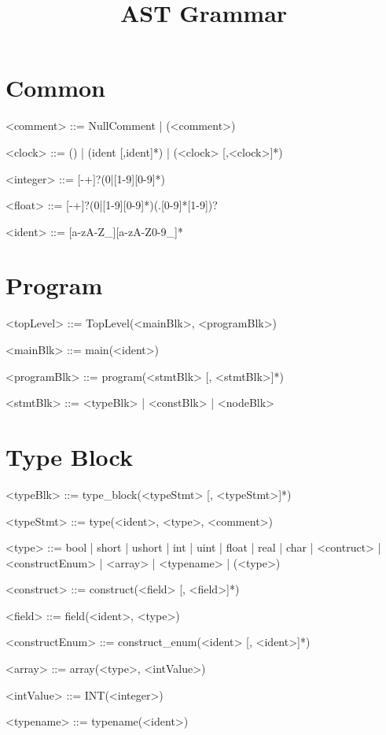 \documentclass{article}
\title{\bf AST Grammar}
\begin{document}
\maketitle

\section{Common}
\begin{grammar} \small

<comment> ::= NullComment | (<comment>)

<clock> ::= () | (ident [,ident]*) | (<clock> [,<clock>]*)

<integer> ::= [-+]?(0|[1-9][0-9]*)

<float> ::= [-+]?(0|[1-9][0-9]*)(.[0-9]*[1-9])?

<ident> ::= [a-zA-Z_][a-zA-Z0-9_]*

\end{grammar}

\section{Program}
\begin{grammar} \small

<topLevel> ::= TopLevel(<mainBlk>, <programBlk>)

<mainBlk> ::= main(<ident>)

<programBlk> ::= program(<stmtBlk> [, <stmtBlk>]*)

<stmtBlk> ::= <typeBlk> | <constBlk> | <nodeBlk>


\end{grammar}

\section{Type Block}
\begin{grammar} \small

<typeBlk> ::= type_block(<typeStmt> [, <typeStmt>]*)

<typeStmt> ::= type(<ident>, <type>, <comment>)

<type> ::= bool | short | ushort | int | uint | float | real | char | <contruct> | <constructEnum> | <array> | <typename> | (<type>)

<construct> ::= construct(<field> [, <field>]*)

<field> ::= field(<ident>, <type>)

<constructEnum> ::= construct_enum(<ident> [, <ident>]*)

<array> ::= array(<type>, <intValue>)

<intValue> ::= INT(<integer>)

<typename> ::= typename(<ident>)

\end{grammar}
\end{document}
